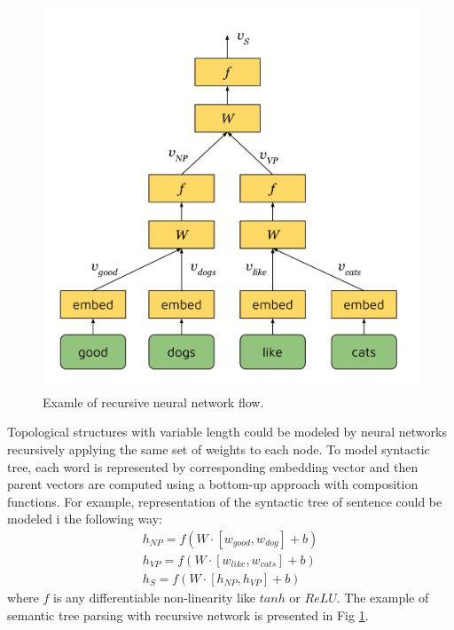 \begin{figure}[h]
\centering
\includegraphics{Figures/rvnn}
\decoRule
\caption[RvNN flow]{Examle of recursive neural network flow.}
\label{fig:rvnn}
\end{figure}

Topological structures with variable length could be modeled by neural networks recursively applying the same set of weights to each node. To model syntactic tree, each word is represented by corresponding embedding vector and then parent vectors are computed using a bottom-up approach with composition functions. For example, representation of the syntactic tree of sentence  could be modeled i the following way:
\begin{equation}
\begin{split}
h_{NP} = f(W\cdot[w_{good}, w_{dog}] + b)\\
h_{VP} = f(W\cdot[w_{like}, w_{cats}] + b)\\
h_S = f(W\cdot[h_{NP}, h_{VP}] + b)
\label{rvnn:example}
\end{split}
\end{equation}
where $f$ is any differentiable non-linearity like $tanh$ or $ReLU$. The example of semantic tree parsing with recursive network is presented in Fig \ref{fig:rvnn}.

